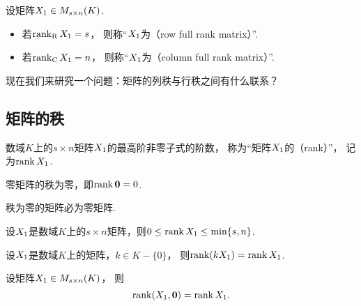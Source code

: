 \begin{definition}
设矩阵\(X_1 \in M_{s \times n}(K)\).
\begin{itemize}
	\item 若\(\rank_{\mathrm{R}}X_1 = s\)，
	则称“\(X_1\)为（row full rank matrix）”.
	\item 若\(\rank_{\mathrm{C}}X_1 = n\)，
	则称“\(X_1\)为（column full rank matrix）”.
\end{itemize}
\end{definition}

现在我们来研究一个问题：矩阵的列秩与行秩之间有什么联系？

\subsection{矩阵的秩}
\begin{definition}\label{definition:线性方程组.矩阵的秩的定义}
数域\(K\)上的\(s \times n\)矩阵\(X_1\)的最高阶非零子式的阶数，
称为“矩阵\(X_1\)的（rank）”，
记为\(\rank X_1\).
\end{definition}

\begin{proposition}\label{theorem:向量空间.零矩阵的秩为零}
零矩阵的秩为零，即\(\rank\boldsymbol0 = 0\).
\end{proposition}
\begin{proposition}\label{theorem:向量空间.秩为零的矩阵必为零矩阵}
秩为零的矩阵必为零矩阵.
\end{proposition}

\begin{property}\label{theorem:线性方程组.矩阵的秩的性质2}
设\(X_1\)是数域\(K\)上的\(s \times n\)矩阵，则\(0 \leq \rank X_1 \leq \min\{s,n\}\).
\end{property}

\begin{property}\label{theorem:线性方程组.矩阵的秩的性质3}
设\(X_1\)是数域\(K\)上的矩阵，\(k \in K-\{0\}\)，
则\(\rank(kX_1) = \rank X_1\).
\end{property}

\begin{property}
设矩阵\(X_1 \in M_{s \times n}(K)\)，
则\begin{equation*}
	\rank(X_1,\boldsymbol0) = \rank X_1.
\end{equation*}
\end{property}

